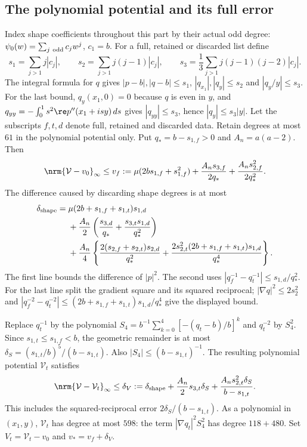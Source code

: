 \subsection{The polynomial potential and its full error}\label{gd:sec:potential}
Index shape coefficients throughout this part by their actual odd degree:
$\psi_0(w)=\sum_{j\ {\rm odd}}c_jw^j$, $c_1=b$.
For a full, retained or discarded list define
\[
 s_1=\sum_{j>1}j|c_j|,\qquad
 s_2=\sum_{j>1}j(j-1)|c_j|,\qquad
 s_3=\frac13\sum_{j>1}j(j-1)(j-2)|c_j|.
\]
The integral formula for $q$ gives
$|p-b|,|q-b|\le s_1$, $|q_{x_1}|,|q_y|\le s_2$ and
$|q_y/y|\le s_3$. For the last bound, $q_y(x_1,0)=0$ because $q$ is even in $y$, and
$q_{yy}=-\int_0^1s^2\re p''(x_1+isy)\,ds$ gives
$|q_{yy}|\le s_3$, hence $|q_y|\le s_3|y|$.
Let the subscripts $f,t,d$ denote full, retained and discarded data.
Retain degrees at most $61$ in the polynomial potential only.
Put $q_*=b-s_{1,f}>0$ and $A_n=a(a-2)$. Then
\begin{equation}\label{gd:eq:vfull}
 \nrm{\mathcal V-v_0}_\infty\le
 v_f:=\mu(2bs_{1,f}+s_{1,f}^2)
 +\frac{A_ns_{3,f}}{2q_*}+\frac{A_ns_{2,f}^2}{2q_*^2}.
\end{equation}
The difference caused by discarding shape degrees is at most
\begin{equation}\label{gd:eq:shape-error}
 \begin{split}
 \delta_{\rm shape}={}&
 \mu(2b+s_{1,f}+s_{1,t})s_{1,d}\\
 &+\frac{A_n}2\left(\frac{s_{3,d}}{q_*}
                    +\frac{s_{3,t}s_{1,d}}{q_*^2}\right)\\
 &+\frac{A_n}4\left\{
 \frac{2(s_{2,f}+s_{2,t})s_{2,d}}{q_*^2}
 +\frac{2s_{2,t}^2(2b+s_{1,f}+s_{1,t})s_{1,d}}{q_*^4}\right\}.
 \end{split}
\end{equation}
The first line bounds the difference of $|p|^2$.
The second uses $|q_f^{-1}-q_t^{-1}|\le s_{1,d}/q_*^2$.
For the last line split the gradient square and its squared reciprocal;
$|\nabla q|^2\le2s_2^2$ and
$|q_f^{-2}-q_t^{-2}|\le
(2b+s_{1,f}+s_{1,t})s_{1,d}/q_*^4$ give the displayed bound.

Replace $q_t^{-1}$ by the polynomial
$S_4=b^{-1}\sum_{k=0}^4[-(q_t-b)/b]^k$ and $q_t^{-2}$ by $S_4^2$.
Since $s_{1,t}\le s_{1,f}<b$, the geometric remainder is at most
$\delta_S=(s_{1,t}/b)^5/(b-s_{1,t})$.
Also $|S_4|\le(b-s_{1,t})^{-1}$.
The resulting polynomial potential $\mathcal V_t$ satisfies
\begin{equation}\label{gd:eq:potential-error}
 \nrm{\mathcal V-\mathcal V_t}_\infty\le
 \delta_V:=\delta_{\rm shape}
 +\frac{A_n}2s_{3,t}\delta_S
 +\frac{A_ns_{2,t}^2\delta_S}{b-s_{1,t}}.
\end{equation}
This includes the squared-reciprocal error
$2\delta_S/(b-s_{1,t})$. As a polynomial in $(x_1,y)$,
$\mathcal V_t$ has degree at most $598$: the term
$|\nabla q_t|^2S_4^2$ has degree $118+480$.
Set $V_t=\mathcal V_t-v_0$ and $v_*=v_f+\delta_V$.

